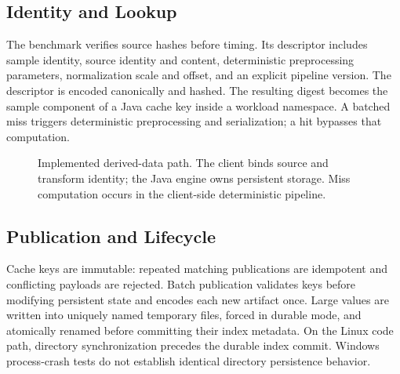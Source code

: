 \documentclass[journal]{IEEEtran}
\begin{document}
\subsection{Identity and Lookup}
The benchmark verifies source hashes before timing. Its descriptor includes sample identity, source identity and content, deterministic preprocessing parameters, normalization scale and offset, and an explicit pipeline version. The descriptor is encoded canonically and hashed. The resulting digest becomes the sample component of a Java cache key inside a workload namespace. A batched miss triggers deterministic preprocessing and serialization; a hit bypasses that computation.

\begin{figure}[t]
\centering
{}
\caption{Implemented derived-data path. The client binds source and transform identity; the Java engine owns persistent storage. Miss computation occurs in the client-side deterministic pipeline.}
\label{fig:architecture}
\end{figure}

\subsection{Publication and Lifecycle}
Cache keys are immutable: repeated matching publications are idempotent and conflicting payloads are rejected. Batch publication validates keys before modifying persistent state and encodes each new artifact once. Large values are written into uniquely named temporary files, forced in durable mode, and atomically renamed before committing their index metadata. On the Linux code path, directory synchronization precedes the durable index commit. Windows process-crash tests do not establish identical directory persistence behavior.
\end{document}
